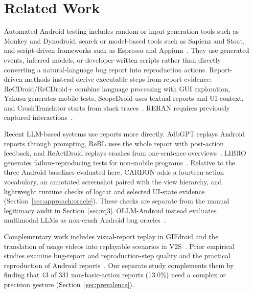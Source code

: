 \documentclass[10pt,conference,a4paper]{IEEEtran}
\begin{document}
  \section{Related Work}
  \label{sec:related}

  Automated Android testing includes random or input-generation tools such
  as Monkey and Dynodroid, search or model-based tools such as Sapienz and
  Stoat, and script-driven frameworks such as Espresso and
  Appium~\cite{monkey,androgenerator,sapienz,stoat,espresso,appium}. They use
  generated events, inferred models, or developer-written scripts rather than
  directly converting a natural-language bug report into reproduction actions.
  Report-driven methods instead derive executable steps from report evidence:
  ReCDroid/ReCDroid+ combine language processing with GUI exploration, Yakusu
  generates mobile tests, ScopeDroid uses textual reports and UI context, and
  CrashTranslator starts from stack
  traces~\cite{recdroid,recdroidplus,yakusu,scopedroid,crashtranslator}.
  RERAN requires previously captured interactions~\cite{reran}.

  Recent LLM-based systems use reports more directly. AdbGPT replays Android
  reports through prompting, ReBL uses the whole report with post-action
  feedback, and ReActDroid replays crashes from one-sentence
  overviews~\cite{adbgpt,rebl,reactdroid}. LIBRO generates
  failure-reproducing tests for non-mobile programs~\cite{libro}. Relative to the three
  Android baselines evaluated here, CARBON adds a fourteen-action vocabulary,
  an annotated screenshot paired with the view hierarchy, and lightweight
  runtime checks of logcat and selected UI-state evidence
  (Section~\ref{sec:approach:oracle}). These checks are separate from the manual
  legitimacy audit in Section~\ref{sec:rq3}. OLLM-Android instead evaluates
  multimodal LLMs as non-crash Android bug oracles~\cite{ollmandroid}.

  Complementary work includes visual-report replay in GIFdroid and the
  translation of usage videos into replayable scenarios in
  V2S~\cite{gifdroid,v2s}. Prior empirical studies examine bug-report and
  reproduction-step quality and the practical reproduction of Android reports~\cite{zimmermann,chaparro-s2r,andror2,johnson-empirical}.
  Our separate study complements them by finding that 43 of 331
  non-basic-action reports (13.0\%) need a complex or precision gesture
  (Section~\ref{sec:prevalence}).

\end{document}
